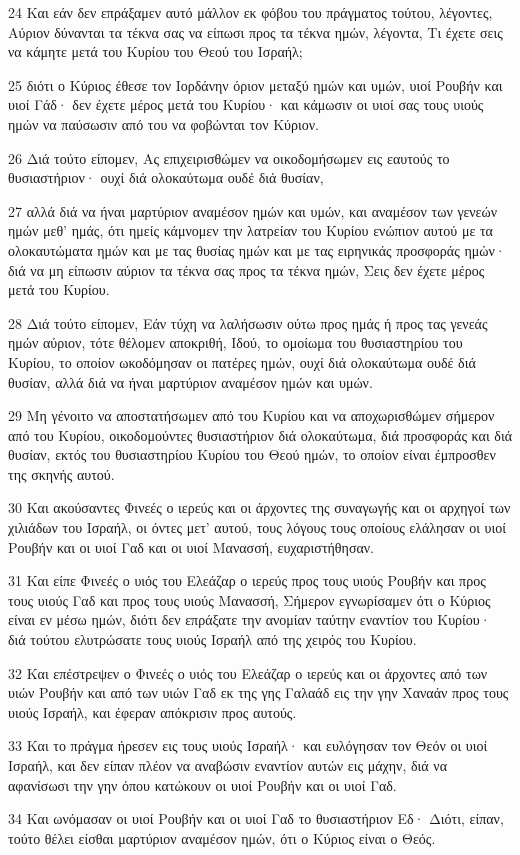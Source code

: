 \par 24 Και εάν δεν επράξαμεν αυτό μάλλον εκ φόβου του πράγματος τούτου, λέγοντες, Αύριον δύνανται τα τέκνα σας να είπωσι προς τα τέκνα ημών, λέγοντα, Τι έχετε σεις να κάμητε μετά του Κυρίου του Θεού του Ισραήλ;
\par 25 διότι ο Κύριος έθεσε τον Ιορδάνην όριον μεταξύ ημών και υμών, υιοί Ρουβήν και υιοί Γάδ· δεν έχετε μέρος μετά του Κυρίου· και κάμωσιν οι υιοί σας τους υιούς ημών να παύσωσιν από του να φοβώνται τον Κύριον.
\par 26 Διά τούτο είπομεν, Ας επιχειρισθώμεν να οικοδομήσωμεν εις εαυτούς το θυσιαστήριον· ουχί διά ολοκαύτωμα ουδέ διά θυσίαν,
\par 27 αλλά διά να ήναι μαρτύριον αναμέσον ημών και υμών, και αναμέσον των γενεών ημών μεθ' ημάς, ότι ημείς κάμνομεν την λατρείαν του Κυρίου ενώπιον αυτού με τα ολοκαυτώματα ημών και με τας θυσίας ημών και με τας ειρηνικάς προσφοράς ημών· διά να μη είπωσιν αύριον τα τέκνα σας προς τα τέκνα ημών, Σεις δεν έχετε μέρος μετά του Κυρίου.
\par 28 Διά τούτο είπομεν, Εάν τύχη να λαλήσωσιν ούτω προς ημάς ή προς τας γενεάς ημών αύριον, τότε θέλομεν αποκριθή, Ιδού, το ομοίωμα του θυσιαστηρίου του Κυρίου, το οποίον ωκοδόμησαν οι πατέρες ημών, ουχί διά ολοκαύτωμα ουδέ διά θυσίαν, αλλά διά να ήναι μαρτύριον αναμέσον ημών και υμών.
\par 29 Μη γένοιτο να αποστατήσωμεν από του Κυρίου και να αποχωρισθώμεν σήμερον από του Κυρίου, οικοδομούντες θυσιαστήριον διά ολοκαύτωμα, διά προσφοράς και διά θυσίαν, εκτός του θυσιαστηρίου Κυρίου του Θεού ημών, το οποίον είναι έμπροσθεν της σκηνής αυτού.
\par 30 Και ακούσαντες Φινεές ο ιερεύς και οι άρχοντες της συναγωγής και οι αρχηγοί των χιλιάδων του Ισραήλ, οι όντες μετ' αυτού, τους λόγους τους οποίους ελάλησαν οι υιοί Ρουβήν και οι υιοί Γαδ και οι υιοί Μανασσή, ευχαριστήθησαν.
\par 31 Και είπε Φινεές ο υιός του Ελεάζαρ ο ιερεύς προς τους υιούς Ρουβήν και προς τους υιούς Γαδ και προς τους υιούς Μανασσή, Σήμερον εγνωρίσαμεν ότι ο Κύριος είναι εν μέσω ημών, διότι δεν επράξατε την ανομίαν ταύτην εναντίον του Κυρίου· διά τούτου ελυτρώσατε τους υιούς Ισραήλ από της χειρός του Κυρίου.
\par 32 Και επέστρεψεν ο Φινεές ο υιός του Ελεάζαρ ο ιερεύς και οι άρχοντες από των υιών Ρουβήν και από των υιών Γαδ εκ της γης Γαλαάδ εις την γην Χαναάν προς τους υιούς Ισραήλ, και έφεραν απόκρισιν προς αυτούς.
\par 33 Και το πράγμα ήρεσεν εις τους υιούς Ισραήλ· και ευλόγησαν τον Θεόν οι υιοί Ισραήλ, και δεν είπαν πλέον να αναβώσιν εναντίον αυτών εις μάχην, διά να αφανίσωσι την γην όπου κατώκουν οι υιοί Ρουβήν και οι υιοί Γαδ.
\par 34 Και ωνόμασαν οι υιοί Ρουβήν και οι υιοί Γαδ το θυσιαστήριον Εδ· Διότι, είπαν, τούτο θέλει είσθαι μαρτύριον αναμέσον ημών, ότι ο Κύριος είναι ο Θεός.

